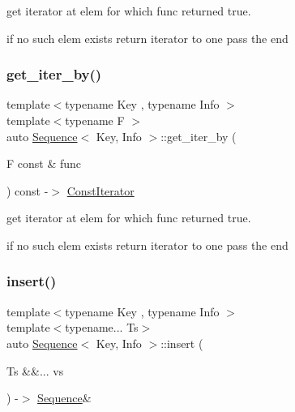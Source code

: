 get iterator at elem for which func returned true. 

if no such elem exists return iterator to one pass the end \mbox{\label{structSequence_a822870dcd8191a4c9e2ffe4033e3c374}} 
\subsubsection{\texorpdfstring{get\_iter\_by()}{get\_iter\_by()}\hspace{0.1cm}{\footnotesize\ttfamily [2/2]}}
{\footnotesize\ttfamily template$<$typename Key , typename Info $>$ \\
template$<$typename F $>$ \\
auto \mbox{\hyperlink{structSequence}{Sequence}}$<$ Key, Info $>$\+::get\+\_\+iter\+\_\+by (\begin{DoxyParamCaption}\item[{F const \&}]{func }\end{DoxyParamCaption}) const -\/$>$ \mbox{\hyperlink{structSequence_1_1ConstIterator}{Const\+Iterator}} \hspace{0.3cm}{\ttfamily [inline]}}



get iterator at elem for which func returned true. 

if no such elem exists return iterator to one pass the end \mbox{\label{structSequence_ad11535a8ff826be81bcb3e80081d4651}} 
\subsubsection{\texorpdfstring{insert()}{insert()}}
{\footnotesize\ttfamily template$<$typename Key , typename Info $>$ \\
template$<$typename... Ts$>$ \\
auto \mbox{\hyperlink{structSequence}{Sequence}}$<$ Key, Info $>$\+::insert (\begin{DoxyParamCaption}\item[{Ts \&\&...}]{vs }\end{DoxyParamCaption}) -\/$>$ \mbox{\hyperlink{structSequence}{Sequence}}\& \hspace{0.3cm}{\ttfamily [inline]}}



